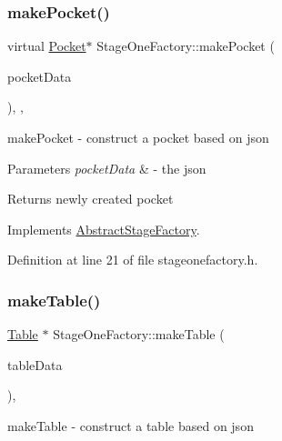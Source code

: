 \subsubsection{\texorpdfstring{make\+Pocket()}{makePocket()}}
{\footnotesize\ttfamily virtual \mbox{\hyperlink{class_pocket}{Pocket}}$\ast$ Stage\+One\+Factory\+::make\+Pocket (\begin{DoxyParamCaption}\item[{const Q\+Json\+Object \&}]{pocket\+Data }\end{DoxyParamCaption})\hspace{0.3cm}{\ttfamily [inline]}, {\ttfamily [override]}, {\ttfamily [virtual]}}



make\+Pocket -\/ construct a pocket based on json 


\begin{DoxyParams}{Parameters}
{\em pocket\+Data} & -\/ the json \\
\hline
\end{DoxyParams}
\begin{DoxyReturn}{Returns}
newly created pocket 
\end{DoxyReturn}


Implements \mbox{\hyperlink{class_abstract_stage_factory_a6ce57859e00b135049e3b995b7dfc94d}{Abstract\+Stage\+Factory}}.



Definition at line 21 of file stageonefactory.\+h.

\mbox{\label{class_stage_one_factory_a31e02c98e5c428f0e1ac0a36e641310d}} 
\subsubsection{\texorpdfstring{make\+Table()}{makeTable()}}
{\footnotesize\ttfamily \mbox{\hyperlink{class_table}{Table}} $\ast$ Stage\+One\+Factory\+::make\+Table (\begin{DoxyParamCaption}\item[{const Q\+Json\+Object \&}]{table\+Data }\end{DoxyParamCaption})\hspace{0.3cm}{\ttfamily [override]}, {\ttfamily [virtual]}}



make\+Table -\/ construct a table based on json 


